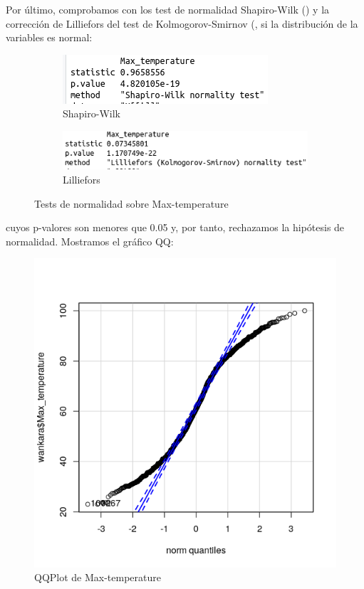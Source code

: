 Por último, comprobamos con los test de normalidad Shapiro-Wilk (\cite{10.1093/biomet/52.3-4.591}) y la corrección de Lilliefors del test de Kolmogorov-Smirnov (\cite{10.1080/01621459.1967.10482916}, si la distribución de la variables es normal:

\begin{figure}[H]
	\centering
	\begin{subfigure}{.5\textwidth}
		\centering
		\includegraphics[width=.7\linewidth]{shapiro-max-temp.png}
		\caption{Shapiro-Wilk}
		\label{fig:sw-max-temp}
	\end{subfigure}%
	\begin{subfigure}{.5\textwidth}
		\centering
		\includegraphics[width=.7\linewidth]{lillie-max-temp.png}	\caption{Lilliefors}
		\label{fig:l-max-temp}
	\end{subfigure}
	\caption{Tests de normalidad sobre Max-temperature}
	\label{fig:norm-max-temp}
\end{figure}

cuyos p-valores son menores que 0.05 y, por tanto, rechazamos la hipótesis de normalidad. Mostramos el gráfico QQ:

\begin{figure}[H] %
	\centering
	\includegraphics[scale=0.7]{qq-max-temp.png}  %
	\caption{QQPlot de Max-temperature} 
	\label{fig:qq-max-temp}
\end{figure}

